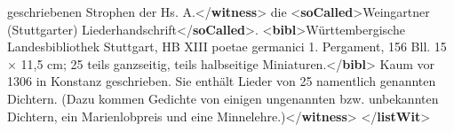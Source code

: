 \begin{shaded}
\hspace*{1em}\hspace*{1em} geschriebenen Strophen der Hs. A.{</\textbf{witness}>}\mbox{}\newline 
{}die {<\textbf{soCalled}>}Weingartner (Stuttgarter)\mbox{}\newline 
\hspace*{1em}\hspace*{1em}\hspace*{1em}\hspace*{1em} Liederhandschrift{</\textbf{soCalled}>}. {<\textbf{bibl}>}Württembergische\mbox{}\newline 
\hspace*{1em}\hspace*{1em}\hspace*{1em}\hspace*{1em} Landesbibliothek Stuttgart, HB XIII poetae germanici 1.\mbox{}\newline 
\hspace*{1em}\hspace*{1em}\hspace*{1em}\hspace*{1em} Pergament, 156 Bll. 15 × 11,5 cm; 25 teils ganzseitig,\mbox{}\newline 
\hspace*{1em}\hspace*{1em}\hspace*{1em}\hspace*{1em} teils halbseitige Miniaturen.{</\textbf{bibl}>} Kaum vor 1306 in Konstanz\mbox{}\newline 
\hspace*{1em}\hspace*{1em} geschrieben. Sie enthält Lieder von 25 namentlich genannten\mbox{}\newline 
\hspace*{1em}\hspace*{1em} Dichtern. (Dazu kommen Gedichte von einigen ungenannten\mbox{}\newline 
\hspace*{1em}\hspace*{1em} bzw. unbekannten Dichtern, ein Marienlobpreis und eine\mbox{}\newline 
\hspace*{1em}\hspace*{1em} Minnelehre.){</\textbf{witness}>}\mbox{}\newline 
{</\textbf{listWit}>}\end{shaded}\egroup\par \noindent  \par
